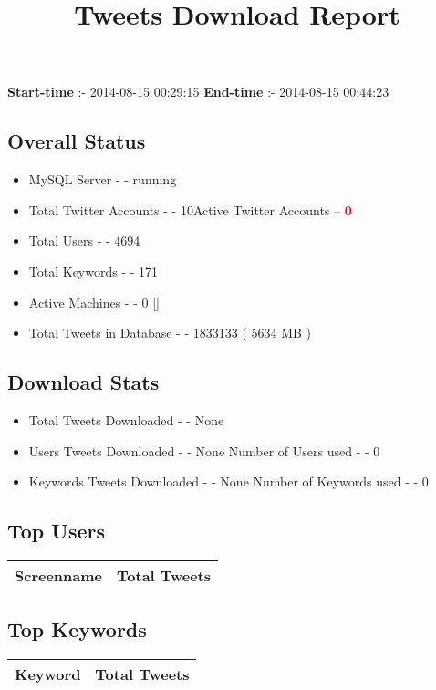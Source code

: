\documentclass{article}\usepackage[T1]{fontenc}
\begin{document}
\title{\textbf{Tweets Download Report}}
               \date{}
                \maketitle
               \centerline{\textbf{Start-time} :- 2014-08-15 00:29:15 \hspace{40pt} \textbf{End-time} :- 2014-08-15 00:44:23}               \subsection*{Overall Status}                \begin{itemize}                \item MySQL Server - - running               \item Total Twitter Accounts - - 10\newline Active Twitter Accounts -- \textcolor{red}{\textbf{0}}               \item Total Users - - 4694               \item Total Keywords - - 171               \item Active Machines - - 0 []               \item Total Tweets in Database - - 1833133 ( 5634 MB )               \end{itemize}               \subsection*{Download Stats}                \begin{itemize}                \item Total Tweets Downloaded - - None               \item Users Tweets Downloaded - - None \newline Number of Users used - - 0               \item Keywords Tweets Downloaded - - None \newline Number of Keywords used - - 0              \end{itemize}              \subsection*{Top Users}\begin{tabular}{|c|c|}         \hline         Screenname & Total Tweets \\ 
 \hline
\end{tabular}\subsection*{Top Keywords}\begin{tabular}{|c|c|}         \hline         Keyword & Total Tweets \\ 
 \hline
\end{tabular}
\end{document}
